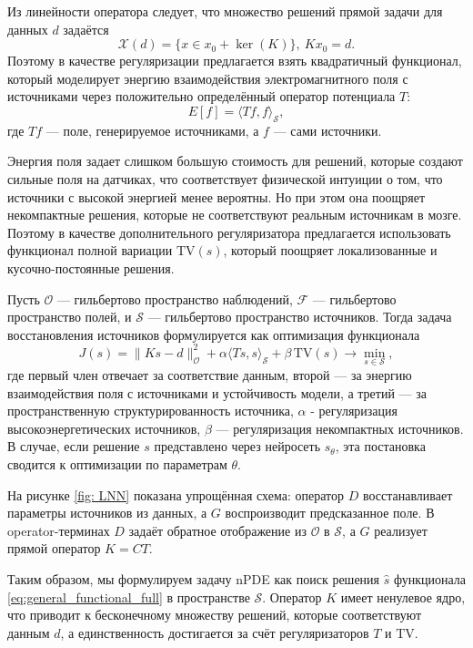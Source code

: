 \documentclass[sn-mathphys-num]{bst/sn-jnl}
\theoremstyle{thmstylethree}
\theoremstyle{thmstyletwo}
\theoremstyle{thmstyleone}
\begin{document}
Из линейности оператора следует, что множество решений прямой задачи для данных $d$ задаётся 
$$\mathcal{X}(d)=\{x \in x_0 + \ker(K)\},~Kx_0=d.$$
Поэтому в качестве регуляризации предлагается взять квадратичный функционал, который моделирует энергию взаимодействия электромагнитного поля с источниками через положительно определённый оператор потенциала $T$:
\begin{equation}
    E[f] = \langle T f, f \rangle_{\mathcal{S}},
\end{equation}
где $Tf$ — поле, генерируемое источниками, а $f$ — сами источники.

Энергия поля задает слишком большую стоимость для решений, которые создают сильные поля на датчиках, что соответствует 
физической интуиции о том, что источники с высокой энергией менее вероятны. Но при этом она поощряет некомпактные решения,
которые не соответствуют реальным источникам в мозге. 
Поэтому в качестве дополнительного регуляризатора предлагается использовать функционал полной вариации $\mathrm{TV}(s)$, 
который поощряет локализованные и кусочно-постоянные решения.

Пусть $\mathcal{O}$ — гильбертово пространство наблюдений, $\mathcal{F}$ — гильбертово пространство полей, 
и $\mathcal{S}$ — гильбертово пространство источников.  Тогда задача восстановления источников формулируется 
как оптимизация функционала
\begin{equation}\label{eq:general_functional_full}
    J(s) = \|K s - d\|_{\mathcal{O}}^2 + \alpha \langle T s, s \rangle_{\mathcal{S}} + 
    \beta\,\mathrm{TV}(s) \rightarrow \min_{s\in\mathcal{S}},
\end{equation}
где первый член отвечает за соответствие данным, второй — за энергию взаимодействия поля с источниками и устойчивость модели,
а третий — за пространственную структурированность источника, $\alpha$ - регуляризация высокоэнергетических источников,
$\beta$ — регуляризация некомпактных источников. В случае, если решение $s$ представлено через нейросеть $s_\theta$,
эта постановка сводится к оптимизации по параметрам $\theta$.

На рисунке \ref{fig: LNN} показана упрощённая схема: оператор $D$ восстанавливает параметры источников из данных, 
а $G$ воспроизводит предсказанное поле. В operator-терминах $D$ задаёт обратное отображение из $\mathcal{O}$ в $\mathcal{S}$,
а $G$ реализует прямой оператор $K = C T$.

Таким образом, мы формулируем задачу nPDE как поиск решения $\hat{s}$ функционала \eqref{eq:general_functional_full} в 
пространстве $\mathcal{S}$. Оператор $K$ имеет ненулевое ядро, что приводит к бесконечному множеству решений, 
которые соответствуют данным $d$, а единственность достигается за счёт регуляризаторов $T$ и $\mathrm{TV}$.
\end{document}
